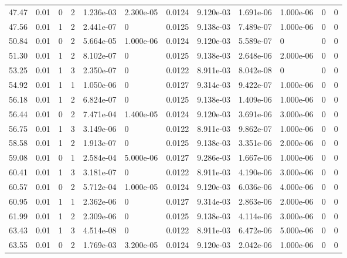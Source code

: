\documentclass[preview]{standalone}
\begin{document}
{{{\begin{tabular}{L{1.2cm}C{1.2cm} C{0.3cm}C{0.5cm} C{1.4cm}C{1.4cm} C{1.4cm}C{1.4cm} C{1.6cm}C{1.6cm} C{1.6cm}C{1.6cm}}
  47.47  &  0.01  & 0     &  2 &  1.236e-03  & 2.300e-05  &  0.0124&   9.120e-03& 1.691e-06 & 1.000e-06   &  0 & 0  \\ 
  47.56  &  0.01  & 1     &  2 &  2.441e-07  & 0  &  0.0125&   9.138e-03& 7.489e-07 & 1.000e-06   &  0 & 0  \\ 
  50.84  &  0.01  & 0     &  2 &  5.664e-05  & 1.000e-06  &  0.0124&   9.120e-03& 5.589e-07 & 0   &  0 & 0  \\ 
  51.30  &  0.01  & 1     &  2 &  8.102e-07  & 0  &  0.0125&   9.138e-03& 2.648e-06 & 2.000e-06   &  0 & 0  \\ 
  53.25  &  0.01  & 1     &  3 &  2.350e-07  & 0  &  0.0122&   8.911e-03& 8.042e-08 & 0   &  0 & 0  \\ 
  54.92  &  0.01  & 1     &  1 &  1.050e-06  & 0  &  0.0127&   9.314e-03& 9.422e-07 & 1.000e-06   &  0 & 0  \\ 
  56.18  &  0.01  & 1     &  2 &  6.824e-07  & 0  &  0.0125&   9.138e-03& 1.409e-06 & 1.000e-06   &  0 & 0  \\ 
  56.44  &  0.01  & 0     &  2 &  7.471e-04  & 1.400e-05  &  0.0124&   9.120e-03& 3.691e-06 & 3.000e-06   &  0 & 0  \\ 
  56.75  &  0.01  & 1     &  3 &  3.149e-06  & 0  &  0.0122&   8.911e-03& 9.862e-07 & 1.000e-06   &  0 & 0  \\ 
  58.58  &  0.01  & 1     &  2 &  1.913e-07  & 0  &  0.0125&   9.138e-03& 3.351e-06 & 2.000e-06   &  0 & 0  \\ 
  59.08  &  0.01  & 0     &  1 &  2.584e-04  & 5.000e-06  &  0.0127&   9.286e-03& 1.667e-06 & 1.000e-06   &  0 & 0  \\ 
  60.41  &  0.01  & 1     &  3 &  3.181e-07  & 0  &  0.0122&   8.911e-03& 4.190e-06 & 3.000e-06   &  0 & 0  \\ 
  60.57  &  0.01  & 0     &  2 &  5.712e-04  & 1.000e-05  &  0.0124&   9.120e-03& 6.036e-06 & 4.000e-06   &  0 & 0  \\ 
  60.95  &  0.01  & 1     &  1 &  2.362e-06  & 0  &  0.0127&   9.314e-03& 2.863e-06 & 2.000e-06   &  0 & 0  \\ 
  61.99  &  0.01  & 1     &  2 &  2.309e-06  & 0  &  0.0125&   9.138e-03& 4.114e-06 & 3.000e-06   &  0 & 0  \\ 
  63.43  &  0.01  & 1     &  3 &  4.514e-08  & 0  &  0.0122&   8.911e-03& 6.472e-06 & 5.000e-06   &  0 & 0  \\ 
  63.55  &  0.01  & 0     &  2 &  1.769e-03  & 3.200e-05  &  0.0124&   9.120e-03& 2.042e-06 & 1.000e-06   &  0 & 0  \\ 

\end{tabular}}}}
\end{document}
